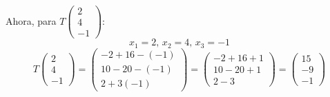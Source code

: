 \begin{prob}
\begin{myproof}
Ahora, para $T\begin{pmatrix} 2 \\ 4 \\ -1 \end{pmatrix}$:
\[
x_1 = 2,\, x_2 = 4,\, x_3 = -1
\]
\[
T\begin{pmatrix} 2 \\ 4 \\ -1 \end{pmatrix} = \begin{pmatrix}
-2 + 16 - (-1) \\
10 - 20 - (-1) \\
2 + 3(-1)
\end{pmatrix}
= \begin{pmatrix}
-2 + 16 + 1 \\
10 - 20 + 1 \\
2 - 3
\end{pmatrix}
= \begin{pmatrix}
15 \\
-9 \\
-1
\end{pmatrix}
\]
\end{myproof}
\end{prob}


